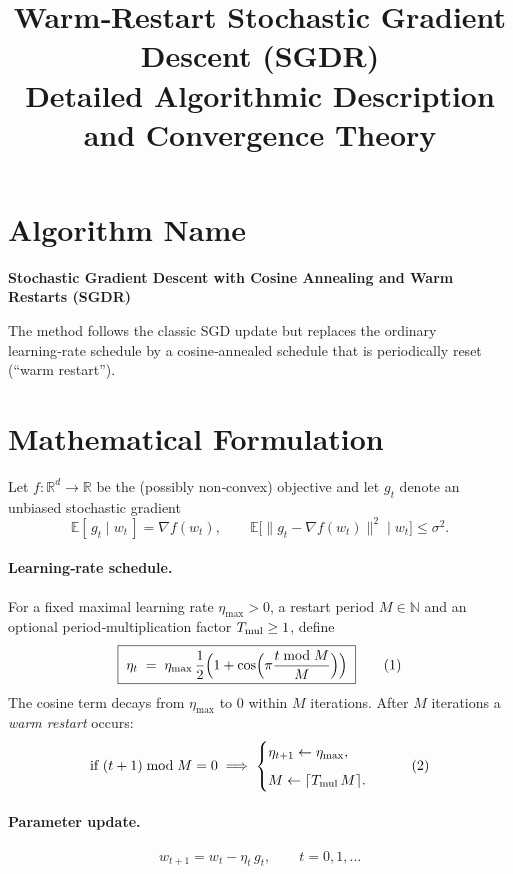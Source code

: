 \documentclass{article}
\begin{document}
\title{Warm‑Restart Stochastic Gradient Descent (SGDR) \\ Detailed Algorithmic Description and Convergence Theory}
\author{}
\date{}
\maketitle

\section*{Algorithm Name}
\textbf{Stochastic Gradient Descent with Cosine Annealing and Warm Restarts (SGDR)}  

The method follows the classic SGD update but replaces the ordinary learning‑rate schedule by a cosine‑annealed schedule that is periodically reset (“warm restart”).

\section*{Mathematical Formulation}

Let $f:\mathbb{R}^d\rightarrow\mathbb{R}$ be the (possibly non‑convex) objective and let $g_t$ denote an unbiased stochastic gradient
\[
\mathbb{E}[\,g_t\mid w_t\,]=\nabla f(w_t),\qquad 
\mathbb{E}\big[\|g_t-\nabla f(w_t)\|^2\mid w_t\big]\le\sigma^2 .
\]

\paragraph{Learning‑rate schedule.}
For a fixed maximal learning rate $\eta_{\max}>0$, a restart period $M\in\mathbb{N}$ and an optional period‑multiplication factor $T_{\rm mul}\ge 1$, define
\[
\boxed{\;
\eta_t \;=\; \eta_{\max}\,
\frac{1}{2}\Bigl(1+\cos\Bigl(\pi\frac{t\bmod M}{M}\Bigr)\Bigr)
\;}
\tag{1}
\]
The cosine term decays from $\eta_{\max}$ to $0$ within $M$ iterations.  
After $M$ iterations a \emph{warm restart} occurs:
\[
\text{if } (t+1)\bmod M =0\;\Longrightarrow\;
\begin{cases}
\eta_{t+1}\gets\eta_{\max},\\[2mm]
M\gets\lceil T_{\rm mul}\,M\rceil .
\end{cases}
\tag{2}
\]

\paragraph{Parameter update.}
\[
\boxed{\;
w_{t+1}=w_t-\eta_t\,g_t,\qquad t=0,1,\dots
\;}
\tag{3}
\]
\end{document}
